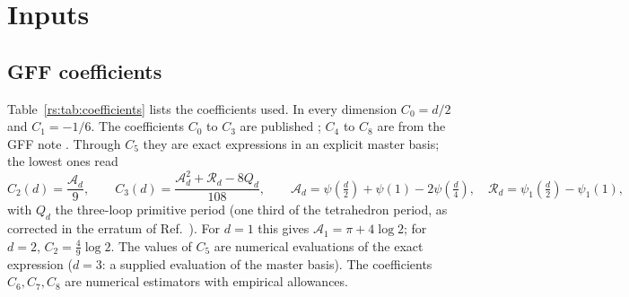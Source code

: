 \section{Inputs}\label{rs:sec:inputs}
\subsection{GFF coefficients}
Table~\ref{rs:tab:coefficients} lists the coefficients used. In every dimension
$C_0=d/2$ and $C_1=-1/6$. The coefficients $C_0$ to $C_3$ are published
\cite{rs:Benedetti:2020rrq}; $C_4$ to $C_8$ are from the GFF note \cite{rs:noteGFF}. Through $C_5$
they are exact expressions in an explicit master basis; the lowest ones read
\begin{equation}
 C_2(d)=\frac{\mathcal A_d}{9},\qquad
 C_3(d)=\frac{\mathcal A_d^2+\mathcal R_d-8Q_d}{108},\qquad
 \mathcal A_d=\psi(\tfrac d2)+\psi(1)-2\psi(\tfrac d4),\quad
 \mathcal R_d=\psi_1(\tfrac d2)-\psi_1(1),
 \label{rs:eq:C2C3}
\end{equation}
with $Q_d$ the three-loop primitive period (one third of the tetrahedron period, as
corrected in the erratum of Ref.~\cite{rs:Benedetti:2020rrq}). For $d=1$ this gives
$\mathcal A_1=\pi+4\log2$; for $d=2$, $C_2=\frac49\log2$. The values of $C_5$ are
numerical evaluations of the exact expression ($d=3$: a supplied evaluation of the
master basis). The coefficients $C_6,C_7,C_8$ are numerical estimators with empirical
allowances.

